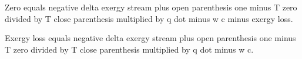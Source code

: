 Zero equals negative delta exergy stream plus open parenthesis one minus T zero divided by T close parenthesis multiplied by q dot minus w c minus exergy loss.  

Exergy loss equals negative delta exergy stream plus open parenthesis one minus T zero divided by T close parenthesis multiplied by q dot minus w c.